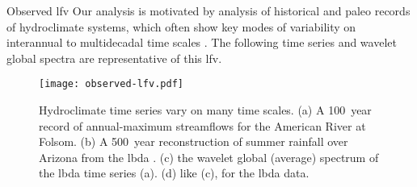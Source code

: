 \begin{block}{Observed \acrshort{lfv}}
  Our analysis is motivated by analysis of historical and paleo records of hydroclimate systems, which often show key modes of variability on interannual to multidecadal time scales \cite{Merz:2014gf, Swierczynski:2012km}.
  The following time series and wavelet global spectra are representative of this \gls{lfv}.
  \begin{figure}
    \centering
    \texttt{[image: observed-lfv.pdf]}
    \caption{
      Hydroclimate time series vary on many time scales.
      (a) A \SI{100}{year} record of annual-maximum streamflows for the American River at Folsom.
      (b) A \SI{500}{year} reconstruction of summer rainfall over Arizona from the \acrfull{lbda} \cite{Cook:2010bz}.
      (c) the wavelet global (average) spectrum of the \gls{lbda} time series (a).
      (d) like (c), for the \gls{lbda} data.
    }\label{fig:observed-lfv}
  \end{figure}
\end{block}
